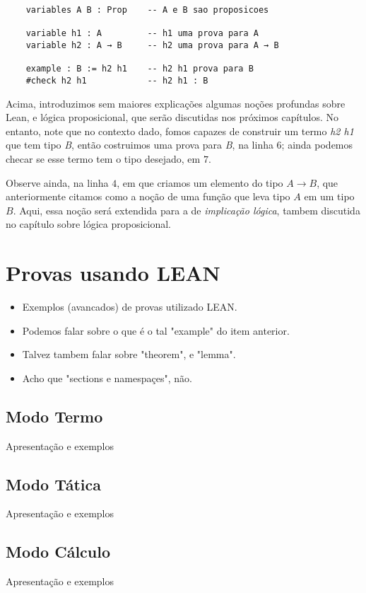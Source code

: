 \vspace{5mm}
\begin{lstlisting}
    variables A B : Prop    -- A e B sao proposicoes

    variable h1 : A         -- h1 uma prova para A
    variable h2 : A → B     -- h2 uma prova para A → B

    example : B := h2 h1    -- h2 h1 prova para B
    #check h2 h1            -- h2 h1 : B
\end{lstlisting}
\vspace{5mm}

Acima, introduzimos sem maiores explicações algumas noções profundas sobre Lean, e lógica proposicional, que serão discutidas nos próximos capítulos.
No entanto, note que no contexto dado, fomos capazes de construir um termo \textit{h2 h1} que tem tipo \textit{B}, então costruimos uma prova para \textit{B}, na linha $6$; ainda podemos checar se esse termo tem o tipo desejado, em $7$.

Observe ainda, na linha $4$, em que criamos um elemento do tipo $A → B$, que anteriormente citamos como a noção de uma função que leva tipo $A$ em um tipo $B$.
Aqui, essa noção será extendida para a de \textit{implicação lógica}, tambem discutida no capítulo sobre lógica proposicional.

\section{Provas usando LEAN}
\begin{itemize}
    \item Exemplos (avancados) de provas utilizado LEAN.
    \item Podemos falar sobre o que é o tal "example" do item anterior.
    \item Talvez tambem falar sobre "theorem", e "lemma".
    \item Acho que "sections e namespaçes", não.
\end{itemize}

\subsection{Modo Termo}
Apresentação e exemplos

\subsection{Modo Tática}
Apresentação e exemplos

\subsection{Modo Cálculo}
Apresentação e exemplos

